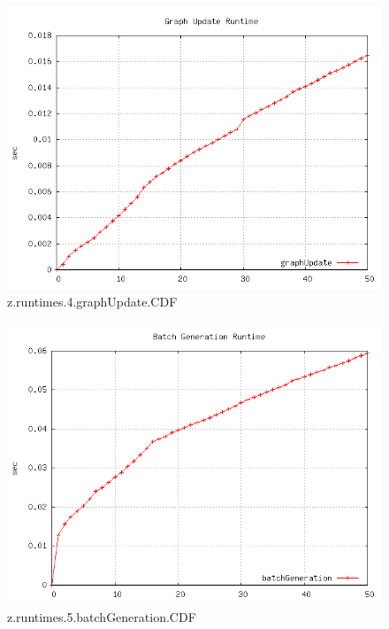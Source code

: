 \begin{figure} [h]
	\centering
	\includegraphics [scale=0.8] {plots/z.runtimes.4.graphUpdate.CDF}
	\caption{z.runtimes.4.graphUpdate.CDF}
	\label{plot:RANDOM_100_500 - BARABASI_ALBERT_GROWTH_10_2.z.runtimes.4.graphUpdate.CDF}
\end{figure}

\begin{figure} [h]
	\centering
	\includegraphics [scale=0.8] {plots/z.runtimes.5.batchGeneration.CDF}
	\caption{z.runtimes.5.batchGeneration.CDF}
	\label{plot:RANDOM_100_500 - BARABASI_ALBERT_GROWTH_10_2.z.runtimes.5.batchGeneration.CDF}
\end{figure}


